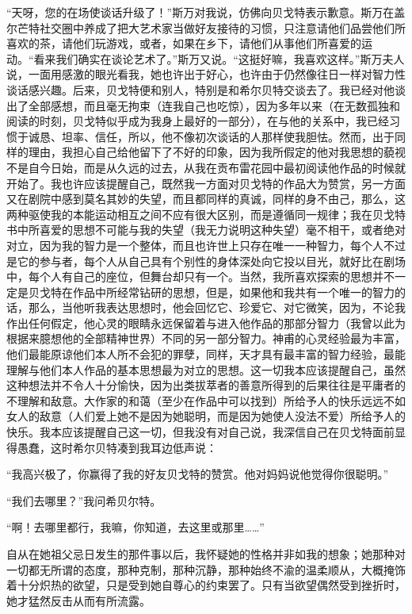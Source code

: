 \par “天呀，您的在场使谈话升级了！”斯万对我说，仿佛向贝戈特表示歉意。斯万在盖尔芒特社交圈中养成了把大艺术家当做好友接待的习惯，只注意请他们品尝他们所喜欢的茶，请他们玩游戏，或者，如果在乡下，请他们从事他们所喜爱的运动。“看来我们确实在谈论艺术了。”斯万又说。“这挺好嘛，我喜欢这样。”斯万夫人说，一面用感激的眼光看我，她也许出于好心，也许由于仍然像往日一样对智力性谈话感兴趣。后来，贝戈特便和别人，特别是和希尔贝特交谈去了。我已经对他谈出了全部感想，而且毫无拘束（连我自己也吃惊），因为多年以来（在无数孤独和阅读的时刻，贝戈特似乎成为我身上最好的一部分），在与他的关系中，我已经习惯于诚恳、坦率、信任，所以，他不像初次谈话的人那样使我胆怯。然而，出于同样的理由，我担心自己给他留下了不好的印象，因为我所假定的他对我思想的藐视不是自今日始，而是从久远的过去，从我在贡布雷花园中最初阅读他作品的时候就开始了。我也许应该提醒自己，既然我一方面对贝戈特的作品大为赞赏，另一方面又在剧院中感到莫名其妙的失望，而且都同样的真诚，同样的身不由己，那么，这两种驱使我的本能运动相互之间不应有很大区别，而是遵循同一规律；我在贝戈特书中所喜爱的思想不可能与我的失望（我无力说明这种失望）毫不相干，或者绝对对立，因为我的智力是一个整体，而且也许世上只存在唯一一种智力，每个人不过是它的参与者，每个人从自己具有个别性的身体深处向它投以目光，就好比在剧场中，每个人有自己的座位，但舞台却只有一个。当然，我所喜欢探索的思想并不一定是贝戈特在作品中所经常钻研的思想，但是，如果他和我共有一个唯一的智力的话，那么，当他听我表达思想时，他会回忆它、珍爱它、对它微笑，因为，不论我作出任何假定，他心灵的眼睛永远保留着与进入他作品的那部分智力（我曾以此为根据来臆想他的全部精神世界）不同的另一部分智力。神甫的心灵经验最为丰富，他们最能原谅他们本人所不会犯的罪孽，同样，天才具有最丰富的智力经验，最能理解与他们本人作品的基本思想最为对立的思想。这一切我本应该提醒自己，虽然这种想法并不令人十分愉快，因为出类拔萃者的善意所得到的后果往往是平庸者的不理解和敌意。大作家的和蔼（至少在作品中可以找到）所给予人的快乐远远不如女人的敌意（人们爱上她不是因为她聪明，而是因为她使人没法不爱）所给予人的快乐。我本应该提醒自己这一切，但我没有对自己说，我深信自己在贝戈特面前显得愚蠢，这时希尔贝特凑到我耳边低声说：
\par “我高兴极了，你赢得了我的好友贝戈特的赞赏。他对妈妈说他觉得你很聪明。”
\par “我们去哪里？”我问希贝尔特。
\par “啊！去哪里都行，我嘛，你知道，去这里或那里……”
\par 自从在她祖父忌日发生的那件事以后，我怀疑她的性格并非如我的想象；她那种对一切都无所谓的态度，那种克制，那种沉静，那种始终不渝的温柔顺从，大概掩饰着十分炽热的欲望，只是受到她自尊心的约束罢了。只有当欲望偶然受到挫折时，她才猛然反击从而有所流露。
